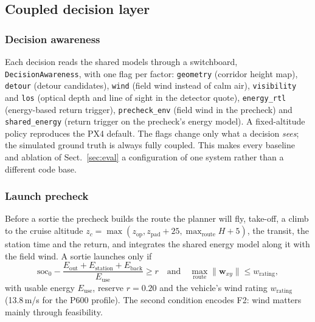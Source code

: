 \subsection{Coupled decision layer}\label{sec:design:decisions}

\subsubsection{Decision awareness}\label{sec:design:awareness}

Each decision reads the shared models through a switchboard, \texttt{DecisionAwareness}, with one flag per factor:
\texttt{geometry} (corridor height map), \texttt{detour} (detour candidates), \texttt{wind} (field wind instead of
calm air), \texttt{visibility} and \texttt{los} (optical depth and line of sight in the detector quote),
\texttt{energy\_rtl} (energy-based return trigger), \texttt{precheck\_env} (field wind in the precheck) and
\texttt{shared\_energy} (return trigger on the precheck's energy model). A fixed-altitude policy reproduces the PX4
default. The flags change only what a decision \emph{sees}; the simulated ground truth is always fully coupled. This
makes every baseline and ablation of Sect.~\ref{sec:eval} a configuration of one system rather than a different
code base.

\subsubsection{Launch precheck}

Before a sortie the precheck builds the route the planner will fly, take-off, a climb to the cruise altitude
$z_c = \max(z_{\mathrm{op}}, z_{\mathrm{pad}} + 25, \max_{\text{route}} H + 5)$, the transit, the station time and the
return, and integrates the shared energy model along it with the field wind. A sortie launches only if
\begin{equation}
\mathrm{soc}_0 - \frac{E_{\mathrm{out}} + E_{\mathrm{station}} + E_{\mathrm{back}}}{E_{\mathrm{use}}} \geq r
\quad\text{and}\quad \max_{\text{route}} \lVert \mathbf{w}_{xy} \rVert \leq w_{\mathrm{rating}},
\end{equation}
with usable energy $E_{\mathrm{use}}$, reserve $r = 0.20$ and the vehicle's wind rating $w_{\mathrm{rating}}$
(13.8\,m/s for the P600 profile). The second condition encodes F2: wind matters mainly through feasibility.

